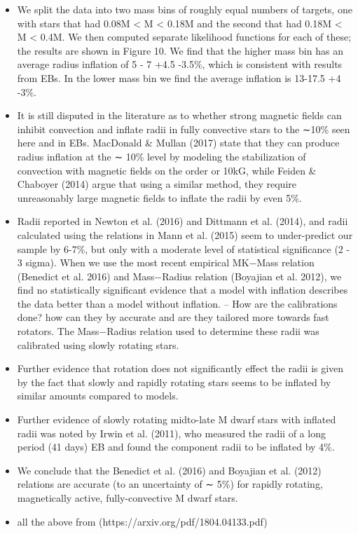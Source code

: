 \begin{itemize}
 
 \item We split the data into two mass bins of roughly equal numbers of targets, one with stars that had 0.08M < M < 0.18M and the second that had 0.18M < M < 0.4M. We then computed separate
likelihood functions for each of these; the results are shown in Figure 10. We find that the higher mass bin has an average radius inflation of 5 - 7 +4.5 -3.5\%, which is consistent with results from EBs. In the lower mass bin we find the average inflation is 13-17.5 +4 -3\%.

\item  It is still disputed in the literature as to whether strong magnetic fields can inhibit convection and inflate radii in fully convective stars to the ∼10\% seen here and in EBs. MacDonald \& Mullan  (2017) state that they can produce radius inflation at the ∼ 10\% level by modeling the stabilization of convection with magnetic fields on the order or 10kG, while Feiden \& Chaboyer (2014) argue that using a similar method, they require unreasonably large magnetic fields to inflate the radii by even 5\%.

\item Radii reported in Newton et al. (2016) and Dittmann et al. (2014), and radii calculated using the relations in Mann et al. (2015) seem to under-predict our sample by 6-7\%, but only with a moderate level of statistical significance (2 - 3 sigma). When we use the most recent empirical MK−Mass relation (Benedict et al. 2016) and Mass−Radius relation (Boyajian et al. 2012), we find no statistically significant evidence that a model with inflation describes the data better than a model without inflation. -- How are the calibrations done? how can they by accurate and are they tailored more towards fast rotators. The Mass−Radius relation used to determine these radii was calibrated using slowly rotating stars.

\item Further evidence that rotation does not significantly effect the radii is given by the fact that slowly and rapidly rotating stars seems to be inflated by similar amounts compared to models.

\item Further evidence of slowly rotating midto-late M dwarf stars with inflated radii was noted by Irwin et al. (2011), who measured the radii of a long period (41 days) EB and found the component radii to be inflated by 4\%.

\item We conclude that the Benedict et al. (2016) and Boyajian et al. (2012) relations are accurate (to an uncertainty of ∼ 5\%) for rapidly rotating, magnetically active, fully-convective M dwarf stars.

\item all the above from (https://arxiv.org/pdf/1804.04133.pdf)

\end{itemize}
\fi


